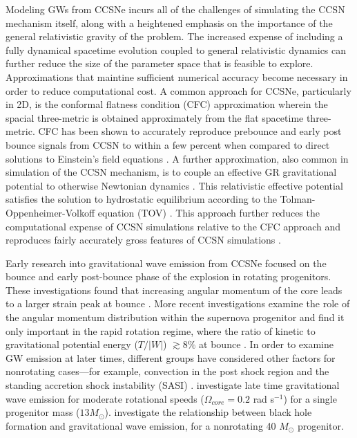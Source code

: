 \documentclass[twocolumn,times]{aastex62}  %
\begin{document}
Modeling GWs from CCSNe incurs all of the challenges of simulating the CCSN mechanism itself, along with a heightened emphasis on the importance of the general relativistic gravity of the problem. 
The increased expense of including a fully dynamical spacetime evolution coupled to general relativistic dynamics \citep[cf.][]{ott:2009, ott:2012} can further reduce the size of the parameter space that is feasible to explore. 
Approximations that maintine sufficient numerical accuracy become necessary in order to reduce computational cost.  
A common approach for CCSNe, particularly in 2D, is the conformal flatness condition (CFC) approximation wherein the spacial three-metric is obtained approximately from the flat spacetime three-metric.
CFC has been shown to accurately reproduce prebounce and early post bounce signals from CCSN to within a few percent when compared to direct solutions to Einstein's field equations  \citep{ott:2007}.
A further approximation, also common in simulation of the CCSN mechanism, is to couple an effective GR gravitational potential to otherwise Newtonian dynamics \citep{rampp:2002, marek:2006, bruenn:2016, oconnor:2018, morozova:2018}.  
This relativistic effective potential satisfies the solution to hydrostatic equilibrium according to the Tolman-Oppenheimer-Volkoff equation (TOV) \citep{rampp:2002, marek:2006}.
This approach further reduces the computational expense of CCSN simulations relative to the CFC approach and reproduces fairly accurately gross features of CCSN simulations \citep{marek:2006, muller:2012}. 

Early research into gravitational wave emission from CCSNe focused on the bounce and early post-bounce phase of the explosion in rotating progenitors.
These investigations found that increasing angular momentum of the core leads to a larger strain peak at bounce \citep{muller:1982,moench:1991,yamada:1995,zwerger:1997,dimm:2002,kotake:2003,shibata:2004}.  
More recent investigations examine the role of the angular momentum distribution within the supernova progenitor and find it only important in the rapid rotation regime, where the ratio of kinetic to gravitational potential energy ($T/|W|$) $ \gtrsim 8\%$ at bounce \citep{abdik:2014}. In order to examine GW emission at later times, different groups have considered other factors for nonrotating cases---for example, convection in the post shock region \citep{burrows:1996,muller:1997,muller:2004,murphy:2009,marek:2009b} and the standing accretion shock instability (SASI) \citep{blondin:2003,blondin:2006,ohnishi:2006,foglizzo:2007,scheck:2008,iwakami:2009,fernandez:2010}.  \citet{moro:2018} investigate late time gravitational wave emission for moderate rotational speeds ($\Omega_{core} = 0.2$ rad s$^{-1}$) for a single progenitor mass ($13 M_\odot$).  \citet{pan:2018} investigate the relationship between black hole formation and gravitational wave emission, for a nonrotating 40 $M_\odot$ progenitor.
 
\end{document}

